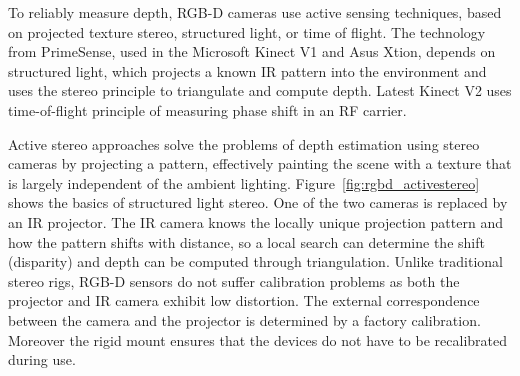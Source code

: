 	To reliably measure depth, RGB-D cameras use active sensing techniques, based on projected texture stereo, structured light, or time of flight. The technology from PrimeSense, used in the Microsoft Kinect V1\cite{Kinect2014} and Asus Xtion, depends on structured light, which projects a known IR pattern into the environment and uses the stereo principle to triangulate and compute depth. Latest Kinect V2 uses time-of-flight principle of measuring phase shift in an RF carrier.
	 
	Active stereo approaches solve the problems of depth estimation using stereo cameras by projecting a pattern, effectively painting the scene with a texture that is largely independent of the ambient lighting. Figure~\ref{fig:rgbd_activestereo} shows the basics of structured light stereo. One of the two cameras is replaced by an IR projector. The IR camera knows the locally unique projection pattern and how the pattern shifts with distance, so a local search can determine the shift (disparity) and depth can be computed through triangulation. Unlike traditional stereo rigs, RGB-D sensors do not suffer calibration problems as both the projector and IR camera exhibit low distortion. The external correspondence between the camera and the projector is determined by a factory calibration. Moreover the rigid mount ensures that the devices do not have to be recalibrated during use.
	

